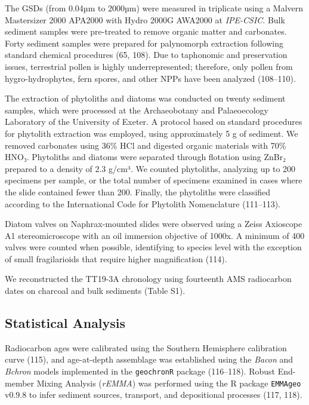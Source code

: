 \documentclass[
]{article}
\begin{document}
The GSDs (from 0.04µm to 2000µm) were measured in triplicate using a
Malvern Mastersizer 2000 APA2000 with Hydro 2000G AWA2000 at
\emph{IPE-CSIC}. Bulk sediment samples were pre-treated to remove
organic matter and carbonates. Forty sediment samples were prepared for
palynomorph extraction following standard chemical procedures (65, 108).
Due to taphonomic and preservation issues, terrestrial pollen is highly
underrepresented; therefore, only pollen from hygro-hydrophytes, fern
spores, and other NPPs have been analyzed (108--110).

The extraction of phytoliths and diatoms was conducted on twenty
sediment samples, which were processed at the Archaeobotany and
Palaeoecology Laboratory of the University of Exeter. A protocol based
on standard procedures for phytolith extraction was employed, using
approximately 5 g of sediment. We removed carbonates using 36\% HCl and
digested organic materials with 70\% HNO₃. Phytoliths and diatoms were
separated through flotation using ZnBr₂ prepared to a density of 2.3
g/cm³. We counted phytoliths, analyzing up to 200 specimens per sample,
or the total number of specimens examined in cases where the slide
contained fewer than 200. Finally, the phytoliths were classified
according to the International Code for Phytolith Nomenclature
(111--113).

Diatom valves on Naphrax-mounted slides were observed using a Zeiss
Axioscope A1 stereomicroscope with an oil immersion objective of 1000x.
A minimum of 400 valves were counted when possible, identifying to
species level with the exception of small fragilarioids that require
higher magnification (114).

We reconstructed the TT19-3A chronology using fourteenth AMS radiocarbon
dates on charcoal and bulk sediments (Table S1).

\subsection{Statistical Analysis}\label{statistical-analysis}

Radiocarbon ages were calibrated using the Southern Hemisphere
calibration curve (115), and age-at-depth assemblage was established
using the \emph{Bacon} and \emph{Bchron} models implemented in the
\texttt{geochronR} package (116--118). Robust End-member Mixing Analysis
(\emph{rEMMA}) was performed using the R package \texttt{EMMAgeo} v0.9.8
to infer sediment sources, transport, and depositional processes (117,
118).
\end{document}
